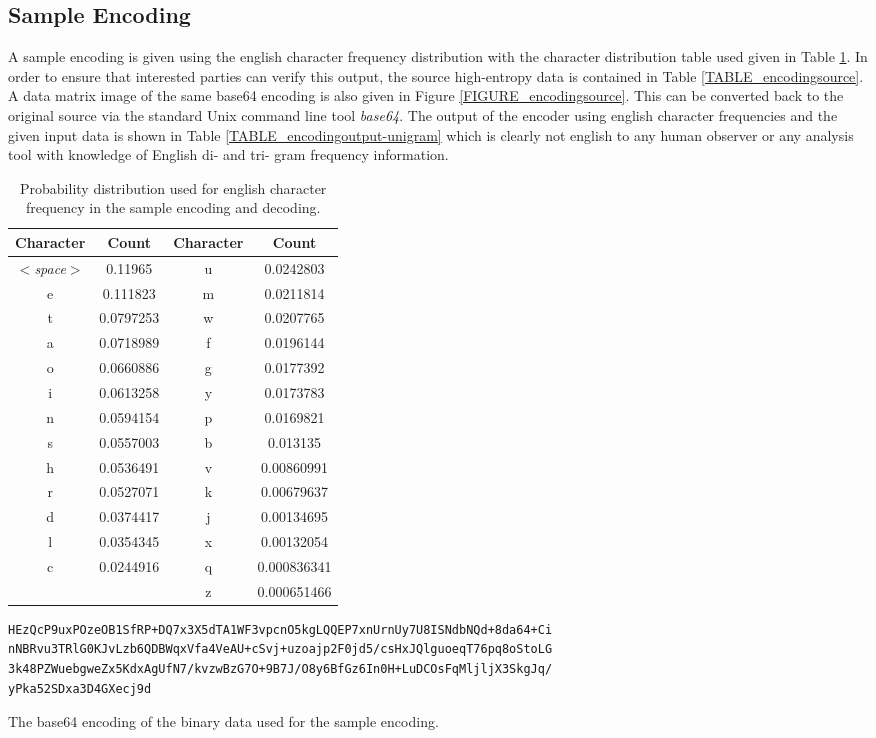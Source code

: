 \documentclass[12pt]{report}
\theoremstyle{remark}
\theoremstyle{definition}
\theoremstyle{definition}
\theoremstyle{definition}
\begin{document}
\begin{appendices}
\section{Sample Encoding}
A sample encoding is given using the english character frequency distribution with the character distribution table used given in Table \ref{TABLE_unigrams}. In order to ensure that interested parties can verify this output, the source high-entropy data is contained in Table \ref{TABLE_encodingsource}. A data matrix image of the same base64 encoding is also given in Figure \ref{FIGURE_encodingsource}. This can be converted back to the original source via the standard Unix command line tool \emph{base64}. The output of the encoder using english character frequencies and the given input data is shown in Table \ref{TABLE_encodingoutput-unigram} which is clearly not english to any human observer or any analysis tool with knowledge of English di- and tri- gram frequency information.

\begin{table}
\centering
\begin{tabular}{ | c | c || c | c | }
Character&Count&Character&Count\\
\hline
$<$\emph{space}$>$&0.11965  &  u&0.0242803\\
e&0.111823 &  m&0.0211814\\
t&0.0797253&  w&0.0207765\\
a&0.0718989&  f&0.0196144\\
o&0.0660886&  g&0.0177392\\
i&0.0613258&  y&0.0173783\\
n&0.0594154&  p&0.0169821\\
s&0.0557003&  b&0.013135\\
h&0.0536491&  v&0.00860991\\
r&0.0527071&  k&0.00679637\\
d&0.0374417&  j&0.00134695\\
l&0.0354345&  x&0.00132054\\
c&0.0244916&  q&0.000836341\\
       &    &  z&0.000651466\\
\end{tabular}
\caption[English character frequency]{Probability distribution used for english character frequency in the sample encoding and decoding.}
\label{TABLE_unigrams}
\end{table}

\begin{table}
\begin{verbatim}
HEzQcP9uxPOzeOB1SfRP+DQ7x3X5dTA1WF3vpcnO5kgLQQEP7xnUrnUy7U8ISNdbNQd+8da64+Ci
nNBRvu3TRlG0KJvLzb6QDBWqxVfa4VeAU+cSvj+uzoajp2F0jd5/csHxJQlguoeqT76pq8oStoLG
3k48PZWuebgweZx5KdxAgUfN7/kvzwBzG7O+9B7J/O8y6BfGz6In0H+LuDCOsFqMljljX3SkgJq/
yPka52SDxa3D4GXecj9d
\end{verbatim}
\caption[Encoding sample - source]{The base64 encoding of the binary data used for the sample encoding.}
\label{TABLE_encodingsource}
\end{table}


\end{appendices}
\end{document}
